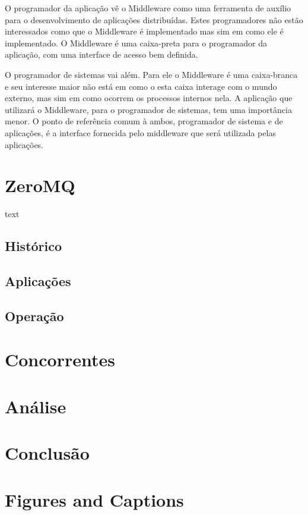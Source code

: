 \documentclass[12pt]{article}
\begin{document}
O programador da aplicação vê o Middleware como uma ferramenta de auxílio para o
desenvolvimento de aplicações distribuídas. Estes programadores não estão interessados
como que o Middleware é implementado mas sim em como ele é implementado. O Middleware é
uma caixa-preta para o programador da aplicação, com uma interface de acesso bem definida.

O programador de sistemas vai além. Para ele o Middleware é uma caixa-branca e seu
interesse maior não está em como o esta caixa interage com o mundo externo, mas sim em
como ocorrem os processos internos nela. A aplicação que utilizará o Middleware, para o
programador de sistemas, tem uma importância menor. O ponto de referência comum à ambos,
programador de sistema e de aplicações, é a interface fornecida pelo middleware que será
utilizada pelas aplicações.

\section{ZeroMQ} \label{sec:firstpage}

text

\subsection{Histórico}
\subsection{Aplicações}
\subsection{Operação}

\section{Concorrentes}

\section{Análise}
\section{Conclusão}

\section{Figures and Captions}\label{sec:figs}
\end{document}
